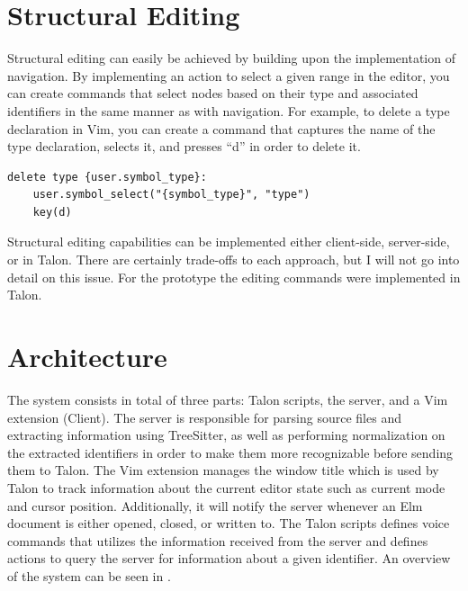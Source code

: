 \documentclass[../thesis.tex]{subfiles}
\begin{document}


\section{Structural Editing}%
\label{sec:structural_editing}
Structural editing can easily be achieved by building upon the implementation of navigation.
By implementing an action to select a given range in the editor, you can create commands
that select nodes based on their type and associated identifiers in the same manner as with navigation.
For example, to delete a type declaration in Vim, you can create a command that captures the name of the type declaration,
selects it, and presses ``d'' in order to delete it.
\begin{verbatim}
delete type {user.symbol_type}: 
    user.symbol_select("{symbol_type}", "type")
    key(d)
\end{verbatim}
Structural editing capabilities can be implemented either client-side, server-side, or in Talon.
There are certainly trade-offs to each approach, but I will not go into detail on this issue.
For the prototype the editing commands were implemented in Talon.



\section{Architecture}%
\label{sec:architecture}
The system consists in total of three parts: Talon scripts, the server, and a Vim extension (Client).
The server is responsible for parsing source files and extracting information using TreeSitter,
as well as performing normalization on the extracted identifiers in order to make them
more recognizable before sending them to Talon.
The Vim extension manages the window title which is used by Talon to track information about the
current editor state such as current mode and cursor position. Additionally, it will notify
the server whenever an Elm document is either opened, closed, or written to.
The Talon scripts defines voice commands that utilizes the information received from the server
and defines actions to query the server for information about a given identifier.
An overview of the system can be seen in .
\end{document}

